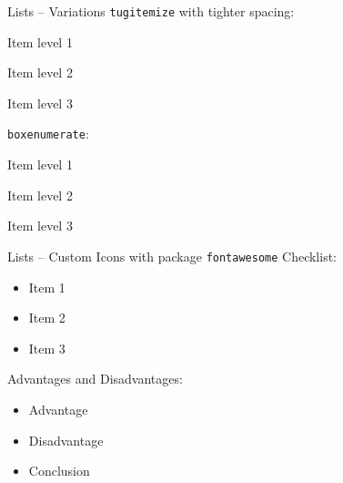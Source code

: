 \documentclass[table,aspectratio=43]{beamer}
\begin{document}
  \begin{frame}{Lists -- Variations}
    \texttt{tugitemize} with tighter spacing:
    \begin{tugitemize}
      \item Item level 1
      \begin{tugitemize}
        \item Item level 2
        \begin{tugitemize}
          \item Item level 3
        \end{tugitemize}
      \end{tugitemize}
    \end{tugitemize}

    \texttt{boxenumerate}:
    \begin{boxenumerate}
      \item Item level 1
      \begin{boxenumerate}
        \item Item level 2
        \begin{boxenumerate}
          \item Item level 3
        \end{boxenumerate}
      \end{boxenumerate}
    \end{boxenumerate}
  \end{frame}

  \newcommand{\checkyes}{\textcolor{tuggreen}{\faCheckSquareO}}
  \newcommand{\checkno}{\textcolor{black}{\faSquareO\,}}
  \begin{frame}[fragile]{Lists -- Custom Icons with package \texttt{fontawesome}}
    Checklist:
    \begin{itemize}
      \item[\checkyes] Item 1
      \item[\checkyes] Item 2
      \item[\checkno] Item 3
    \end{itemize}
    Advantages and Disadvantages:
    \begin{itemize}
      \item[\textcolor{tuggreen}{\faPlusCircle}] Advantage
      \item[\textcolor{tugred}{\faMinusCircle}]  Disadvantage
      \item[\textcolor{tugblue}{\faArrowCircleRight}] Conclusion
    \end{itemize}
  \end{frame}
\end{document}
